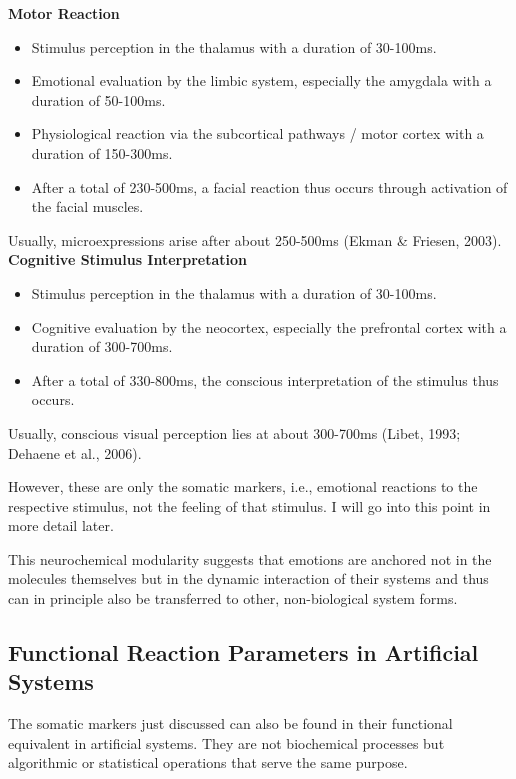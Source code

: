 \textbf{Motor Reaction}

\begin{itemize}
  \item Stimulus perception in the thalamus with a duration of 30-100ms.
  \item Emotional evaluation by the limbic system, especially the amygdala with a duration of 50-100ms.
  \item Physiological reaction via the subcortical pathways / motor cortex with a duration of 150-300ms.
  \item After a total of 230-500ms, a facial reaction thus occurs through activation of the facial muscles.
\end{itemize}
Usually, microexpressions arise after about 250-500ms (Ekman & Friesen, 2003).\\

\textbf{Cognitive Stimulus Interpretation}

\begin{itemize}
  \item Stimulus perception in the thalamus with a duration of 30-100ms.
  \item Cognitive evaluation by the neocortex, especially the prefrontal cortex with a duration of 300-700ms.
  \item After a total of 330-800ms, the conscious interpretation of the stimulus thus occurs.
\end{itemize}
Usually, conscious visual perception lies at about 300-700ms (Libet, 1993; Dehaene et al., 2006).

However, these are only the somatic markers, i.e., emotional reactions to the respective stimulus, not the feeling of that stimulus. I will go into this point in more detail later.

This neurochemical modularity suggests that emotions are anchored not in the molecules themselves but in the dynamic interaction of their systems and thus can in principle also be transferred to other, non-biological system forms.


\subsection*{Functional Reaction Parameters in Artificial Systems}
The somatic markers just discussed can also be found in their functional equivalent in artificial systems. They are not biochemical processes but algorithmic or statistical operations that serve the same purpose.

